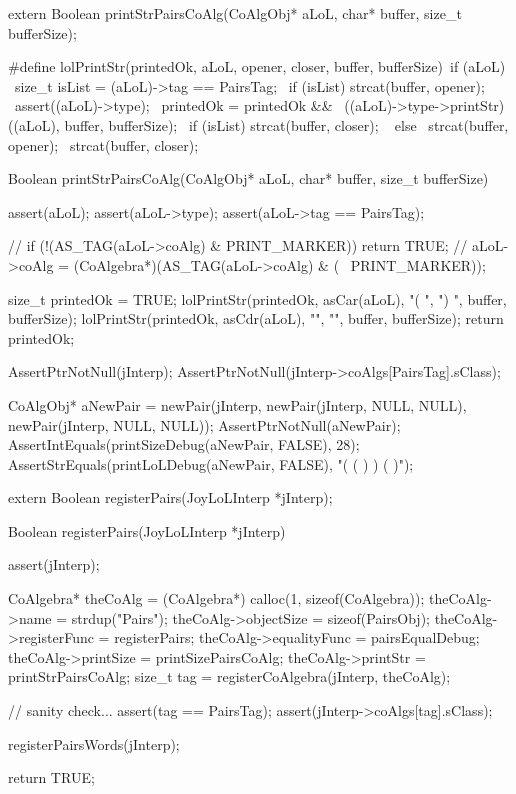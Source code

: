 \startCHeader
extern Boolean printStrPairsCoAlg(CoAlgObj* aLoL,
                                  char* buffer, size_t bufferSize);
\stopCHeader

\startCCode
#define lolPrintStr(printedOk, aLoL, opener, closer, buffer, bufferSize)\
  if (aLoL) {								                                            \
    size_t isList = (aLoL)->tag == PairsTag;        			              \
    if (isList) strcat(buffer, opener);					                        \
    assert((aLoL)->type);						                                    \
    printedOk = printedOk && 						                                \
      ((aLoL)->type->printStr)((aLoL), buffer, bufferSize);		          \
    if (isList) strcat(buffer, closer);					                        \
  } else {								                                              \
    strcat(buffer, opener);						                                  \
    strcat(buffer, closer);						                                  \
  }
  
Boolean printStrPairsCoAlg(CoAlgObj* aLoL,
                           char* buffer, size_t bufferSize) {
  assert(aLoL);
  assert(aLoL->type);
  assert(aLoL->tag == PairsTag);

//  if (!(AS_TAG(aLoL->coAlg) & PRINT_MARKER)) return TRUE;
//  aLoL->coAlg = (CoAlgebra*)(AS_TAG(aLoL->coAlg) & (~ PRINT_MARKER));

  size_t printedOk = TRUE;
  lolPrintStr(printedOk, asCar(aLoL), "( ", ") ", buffer, bufferSize);
  lolPrintStr(printedOk, asCdr(aLoL), "",   "",   buffer, bufferSize);
  return printedOk;
}
\stopCCode


\startCTest
  AssertPtrNotNull(jInterp);
  AssertPtrNotNull(jInterp->coAlgs[PairsTag].sClass);

  CoAlgObj* aNewPair = newPair(jInterp,
                               newPair(jInterp, NULL, NULL),
                               newPair(jInterp, NULL, NULL));
  AssertPtrNotNull(aNewPair);
  AssertIntEquals(printSizeDebug(aNewPair, FALSE), 28);
  AssertStrEquals(printLoLDebug(aNewPair, FALSE), "( ( ) ) ( )");
\stopCTest
\stopTestCase
\stopTestSuite

\startTestSuite[registerPairs]

\startCHeader
extern Boolean registerPairs(JoyLoLInterp *jInterp);
\stopCHeader
\setCHeaderStream{public}

\startCCode
Boolean registerPairs(JoyLoLInterp *jInterp) {
  assert(jInterp);
  
  CoAlgebra* theCoAlg    = (CoAlgebra*) calloc(1, sizeof(CoAlgebra));
  theCoAlg->name         = strdup("Pairs");
  theCoAlg->objectSize   = sizeof(PairsObj);
  theCoAlg->registerFunc = registerPairs;
  theCoAlg->equalityFunc = pairsEqualDebug;
  theCoAlg->printSize    = printSizePairsCoAlg;
  theCoAlg->printStr     = printStrPairsCoAlg;
  size_t tag = registerCoAlgebra(jInterp, theCoAlg);
  
  // sanity check...
  assert(tag == PairsTag);
  assert(jInterp->coAlgs[tag].sClass);
    
  registerPairsWords(jInterp);
  
  return TRUE;
}
\stopCCode

